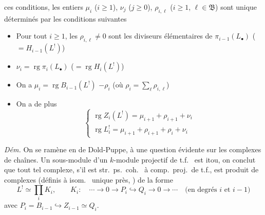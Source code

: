 \documentclass[11pt,a4paper]{article}
\begin{document}
ces conditions, les entiers $\mu_{i}$ ($i \geqslant 1$), $\nu_{j}$ ($j
\geqslant 0$), $\rho_{i,\ell}$ ($i \geqslant 1$, $\ell \in \mathfrak{B}$) sont
unique déterminés par les conditions suivantes
\begin{itemize}
  \item[a)] Pour tout $i \geqslant 1$, les $\rho_{i,\ell} \neq 0$ sont les
   diviseurs élémentaires de 
  $\pi_{i-1}(L_{\bullet})$ ($= H_{i-1}(L^{!})$)
  \item[b)] \struck{\ill{}} $\nu_{i} = \operatorname{rg} \pi_{i}(L_{\bullet})$
  ($= \operatorname{rg} H_{i}(L^{!})$)
  \item[c)] On a  $\mu_{i} = \operatorname{rg}
  B_{i-1}(L^{!})$ \struck{\ill{}} $- \rho_{i}$ (où $\rho_{i} =
  \sum_{\ell} \rho_{i,\ell}$)
  \item[d)] On a de plus
  \[
    \begin{cases}
      \operatorname{rg} Z_{i}(L^{!}) = \mu_{i+1} + \rho_{i+1} + \nu_{i} \\
      \operatorname{rg} L^{!}_{i} = \mu_{i+1} + \rho_{i+1} + \rho_{i} +
      \nu_{i}
    \end{cases}
  \]
\end{itemize}

\emph{Dém.} \struck{\ill{}} On se ramène en  de
Dold-Puppe, à une question  évidente sur les complexes de
chaînes. \ill{} \struck{\ill{}} Un sous-module d'un $k$-module projectif de
t.f.\ \ill{} est itou, on conclut que tout tel complexe, s'il est
 str.\ ps.\ coh.\ \ill{} à comp.\ proj.\ de t.f., est
\struck{\ill{}} \ill{} produit de complexes (définis à isom.\ 
unique près,  \ill{}) de la forme
\[
  L^{!} \simeq \prod_{i} K_{i}, \qquad
  K_{i} : \quad \cdots \to 0 \to P_{i} \hookrightarrow Q_{i} \to 0 \to
  \cdots \quad \text{(en degrés $i$ et $i-1$)}
\]
avec $P_{i} = B_{i-1} \hookrightarrow Z_{i-1} \simeq Q_{i}$.
\end{document}
